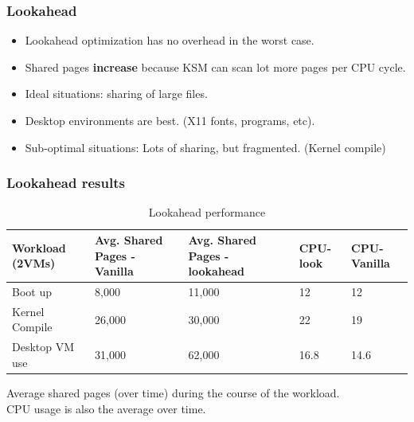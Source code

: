 \documentclass{beamer}
\begin{document}
\begin{frame}
  \frametitle{Lookahead}
  \begin{itemize}
  \item Lookahead optimization has no overhead in the worst case.
  \item Shared pages \textbf{increase} because KSM can scan lot more pages per CPU cycle.
  \item Ideal situations: sharing of large files.
  \item Desktop environments are best. (X11 fonts, programs, etc). 
  \item Sub-optimal situations: Lots of sharing, but fragmented. (Kernel compile)
  \end{itemize}
\end{frame}


\begin{frame}
  \frametitle{Lookahead results}
\begin{table}
\begin{center}
\begin{tabular}{|p{2cm}|p{2cm}|p{2cm}|p{1.2cm}|p{1.2cm}|}
\hline
 Workload (2VMs)  &  Avg. Shared Pages - Vanilla  &  Avg. Shared Pages - lookahead  &  CPU-look  &  CPU-Vanilla  \\
\hline
 Boot up          &  8,000                        &  11,000                         &        12  &           12  \\ \hline
 Kernel Compile   &  26,000                       &  30,000                         &        22  &           19  \\ \hline
 Desktop VM use   &  31,000                       &  62,000                         &      16.8  &         14.6  \\ 
\hline
\end{tabular}
\caption{Lookahead performance}
\end{center}
\end{table}

Average shared pages (over time) during the course of the workload.  \\
CPU usage is also the average over time. 

\end{frame}
\end{document}
